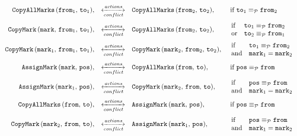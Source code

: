 \documentclass{article}
\newcommand{\cActions}{\xleftrightarrow[conflict]{actions}}
\newcommand{\pEquiv}{\equiv_\mathcal{P}}
\begin{document}
{\[\begin{array}{rcll}
\texttt{CopyAllMarks}\,(\texttt{from}_1,\,\texttt{to}_1), &
\cActions &
\texttt{CopyAllMarks}\,(\texttt{from}_2,\,\texttt{to}_2), &
\mbox{ if } \texttt{to}_1 \pEquiv \texttt{from}_2
\vspace{2mm} \\

\texttt{CopyMark}\,(\texttt{mark},\, \texttt{from}_1,\,\texttt{to}_1), &
\cActions &
\texttt{CopyAllMarks}\,(\texttt{from}_2,\,\texttt{to}_2), &
\begin{array}{ll}
\mbox{if} & \texttt{to}_1 \pEquiv \texttt{from}_2 \\
\mbox{or} & \texttt{to}_2 \pEquiv \texttt{from}_1
\end{array}
\vspace{2mm} \\

\texttt{CopyMark}\,(\texttt{mark}_1,\,\texttt{from}_1,\,\texttt{to}_1), &
\cActions &
\texttt{CopyMark}\,(\texttt{mark}_2,\,\texttt{from}_2,\,\texttt{to}_2), &
\begin{array}{ll}
\mbox{if} & \texttt{to}_1 \pEquiv \texttt{from}_2 \\
\mbox{and} & \texttt{mark}_1 = \texttt{mark}_2
\end{array}
\vspace{2mm} \\

\texttt{AssignMark}\,(\texttt{mark},\,\texttt{pos}), &
\cActions &
\texttt{CopyAllMarks}\,(\texttt{from},\,\texttt{to}), &
\mbox{ if } \texttt{pos} \pEquiv \texttt{from}
\vspace{2mm} \\

\texttt{AssignMark}\,(\texttt{mark}_1,\,\texttt{pos}), &
\cActions &
\texttt{CopyMark}\,(\texttt{mark}_2,\,\texttt{from},\,\texttt{to}), &
\begin{array}{ll}
\mbox{if} & \texttt{pos} \pEquiv \texttt{from} \\
\mbox{and} & \texttt{mark}_1 = \texttt{mark}_2
\end{array}
\vspace{2mm} \\

\texttt{CopyAllMarks}\,(\texttt{from},\,\texttt{to}), &
\cActions &
\texttt{AssignMark}\,(\texttt{mark},\,\texttt{pos}), &
\mbox{ if } \texttt{pos} \pEquiv \texttt{from}
\vspace{2mm} \\

\texttt{CopyMark}\,(\texttt{mark}_2,\,\texttt{from},\,\texttt{to}), &
\cActions &
\texttt{AssignMark}\,(\texttt{mark}_1,\,\texttt{pos}), &
\begin{array}{ll}
\mbox{if} & \texttt{pos} \pEquiv \texttt{from} \\
\mbox{and} & \texttt{mark}_1 = \texttt{mark}_2
\end{array}

\end{array}
\]}
\end{document}
